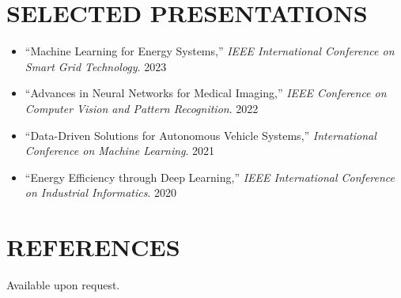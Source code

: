 \documentclass[a4paper,11pt]{article}
\begin{document}
\section{SELECTED PRESENTATIONS}
\begin{itemize}[leftmargin=0.7cm,itemsep=0cm]
\item ``Machine Learning for Energy Systems,'' {\it IEEE International Conference on Smart Grid Technology}. \hfill 2023
\item ``Advances in Neural Networks for Medical Imaging,'' {\it IEEE Conference on Computer Vision and Pattern Recognition}. \hfill 2022
\item ``Data-Driven Solutions for Autonomous Vehicle Systems,'' {\it International Conference on Machine Learning}. \hfill 2021
\item ``Energy Efficiency through Deep Learning,'' {\it IEEE International Conference on Industrial Informatics}. \hfill 2020
\end{itemize}

\section{REFERENCES}
Available upon request.
\end{document}

